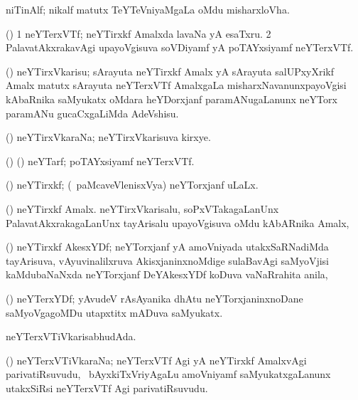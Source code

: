 \bentry
{}
\gl{\nA}
\bmng
niTinAlf; nikalf matutx TeYTeVniyaMgaLa oMdu misharxloVha. 
\emng
\eentry

\bentry
{}
\gl{\nA}
\bmng
(\ravi) 
\bnum
\num{1} neYTerxVTf; neYTirxkf Amalxda lavaNa yA esaTxru. 
\num{2} PalavatAkxrakavAgi upayoVgisuva soVDiyamf yA poTAYxsiyamf neYTerxVTf. 
\enum
\emng
\eentry

\bentry
{}
\gl{\sakirx}
\bmng
(\ravi) neYTirxVkarisu; sArayuta neYTirxkf Amalx yA sArayuta salUPxyXrikf Amalx matutx sArayuta neYTerxVTf AmalxgaLa misharxNavanunxpayoVgisi kAbaRnika saMyukatx oMdara heYDorxjanf paramANugaLanunx neYTorx paramANu gucaCxgaLiMda AdeVshisu. 
\emng
\eentry

\bentry
{}
\gl{\nA}
\bmng
(\ravi) neYTirxVkaraNa; neYTirxVkarisuva kirxye. 
\emng
\eentry

\bentry
{}
\gl{\nA}
\bmng
(\birx) (\ravi) neYTarf; poTAYxsiyamf neYTerxVTf. 
\emng
\eentry

\bentry
{}
\gl{\gu}
\bmng
(\ravi) neYTirxkf; (\kanmu\ paMcaveVlenisxVya) neYTorxjanf uLaLx. 
\emng
\eentry

\bentry
{}
\gl{\nA}
\bmng
(\ravi) neYTirxkf Amalx. neYTirxVkarisalu, soPxVTakagaLanUnx PalavatAkxrakagaLanUnx tayArisalu upayoVgisuva oMdu kAbARnika Amalx,  
\emng
\eentry

\bentry
{}
\gl{\nA}
\bmng
(\ravi) neYTirxkf AkesxYDf; neYTorxjanf yA amoVniyada utakxSaRNadiMda tayArisuva, vAyuvinalilxruva AkisxjaninxnoMdige sulaBavAgi saMyoVjisi kaMdubaNaNxda neYTorxjanf DeYAkesxYDf koDuva vaNaRrahita anila,  
\emng
\eentry

\bentry
{}
\gl{\nA}
\bmng
(\ravi) neYTerxYDf; yAvudeV rAsAyanika dhAtu neYTorxjaninxnoDane saMyoVgagoMDu utapxtitx mADuva saMyukatx. 
\emng
\eentry

\bentry
{}
\gl{\gu}
\bmng
neYTerxVTiVkarisabhudAda. 
\emng
\eentry

\bentry
{}
\gl{\nA}
\bmng
(\ravi) neYTerxVTiVkaraNa; neYTerxVTf Agi yA neYTirxkf AmalxvAgi parivatiRsuvudu, \kanmu\ bAyxkiTxVriyAgaLu amoVniyamf saMyukatxgaLanunx utakxSiRsi neYTerxVTf Agi parivatiRsuvudu. 
\emng
\eentry

